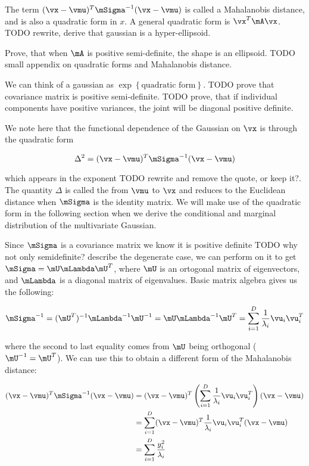 \begin{tcolorbox}
  The term $(\vx - \vmu)^T \mSigma^{-1}(\vx - \vmu)$ is called a Mahalanobis
  distance, and is also a quadratic form in $x$. A general quadratic form is
  $\vx^T \mA \vx$. {TODO rewrite, derive that gaussian is a hyper-ellipsoid}.

  Prove, that when $\mA$ is positive semi-definite, the shape is an ellipsoid.
  {TODO small appendix on quadratic forms and Mahalanobis distance}.

  We can think of a gaussian as $\exp{\left\{ \text{quadratic form} \right\}
    }$. {TODO prove that covariance matrix is positive semi-definite}. {TODO
    prove, that if individual components have positive variances, the joint will be
  diagonal positive definite}.

  We note here that the functional dependence of the Gaussian on $\vx$ is
  through the quadratic form

  \begin{equation}
    \Delta^2 = (\vx - \vmu)^T \mSigma^{-1} (\vx - \vmu)
  \end{equation}

  which appears in the exponent \citep{bishop2016pattern} {TODO rewrite and
  remove the quote, or keep it?}. The quantity $\Delta$ is called the
   from $\vmu$ to $\vx$ and reduces to the
  Euclidean distance when $\mSigma$ is the identity matrix. We will make use of
  the quadratic form in the following section when we derive the conditional
  and marginal distribution of the multivariate Gaussian.

  Since $\mSigma$ is a covariance matrix we know it is positive definite {TODO
  why not only semidefinite? describe the degenerate case}, we can perform
   on it to get $\mSigma = \mU \mLambda \mU^T$,
  where $\mU$ is an ortogonal matrix of eigenvectors, and $\mLambda$ is a
  diagonal matrix of eigenvalues. Basic matrix algebra gives us the following:

  \begin{equation}
    \mSigma^{-1} = (\mU^T)^{-1} \mLambda^{-1} \mU^{-1} = \mU \mLambda^{-1}
    \mU^T = \sum_{i = 1}^D \frac{1}{\lambda_i} \vu_i \vu_i^T
  \end{equation}

  where the second to last equality comes from $\mU$ being orthogonal
  ($\mU^{-1} = \mU^T$). We can use this to obtain a different form of the
  Mahalanobis distance:

  \begin{align}
    (\vx - \vmu)^T \mSigma^{-1} (\vx - \vmu) &= (\vx - \vmu)^T \left( \sum_{i = 1}^D \frac{1}{\lambda_i} \vu_i \vu_i^T \right) (\vx - \vmu) \\
                                             &= \sum_{i = 1}^D (\vx - \vmu)^T \frac{1}{\lambda_i} \vu_i \vu_i^T (\vx - \vmu) \\
                                             &= \sum_{i = 1}^D \frac{y_i^2}{\lambda_i} \label{eq:mvn-ellipse}
  \end{align}


\end{tcolorbox}
